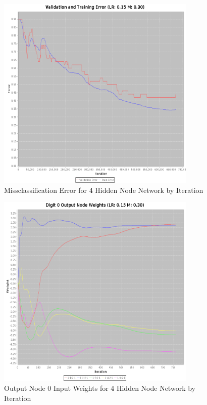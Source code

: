 \documentclass{article}
\begin{document}
\begin{figure}
\centering
\includegraphics[width=0.85\textwidth]{data/final/4_hidden_node_error.png}
\caption{Missclassification Error for 4 Hidden Node Network by Iteration}
\label{error4}
\end{figure}

\begin{figure}
\centering
\includegraphics[width=0.85\textwidth]{data/final/4_hidden_node_0weight.png}
\caption{Output Node 0 Input Weights for 4 Hidden Node Network by Iteration}
\label{weight4}
\end{figure}
\end{document}
